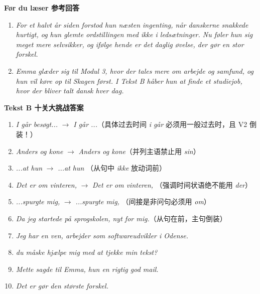 \begin{answerbox}
\textbf{Før du læser 参考回答}
\begin{enumerate}
  \item \textit{For et halvt år siden forstod hun næsten ingenting, når danskerne snakkede hurtigt, og hun glemte ordstillingen med \textit{ikke} i ledsætninger. Nu føler hun sig meget mere selvsikker, og ifølge hende er det daglig øvelse, der gør en stor forskel.}
  \item \textit{Emma glæder sig til Modul 3, hvor der tales mere om arbejde og samfund, og hun vil køre op til Skagen først. I Tekst B håber hun at finde et studiejob, hvor der bliver talt dansk hver dag.}
\end{enumerate}

\textbf{Tekst B 十关大挑战答案}
\begin{enumerate}
  \item[(1)] \textit{I går  besøgt...} $\rightarrow$ \textit{I går ...}（具体过去时间 \textit{i går} 必须用一般过去时，且 V2 倒装！）
  \item[(2)] \textit{Anders og  kone} $\rightarrow$ \textit{Anders og  kone}（并列主语禁止用 \textit{sin}）
  \item[(3)] \textit{...at hun } $\rightarrow$ \textit{...at hun }（从句中 \textit{ikke} 放动词前）
  \item[(4)] \textit{Det er om vinteren, } $\rightarrow$ \textit{Det er om vinteren, }（强调时间状语绝不能用 \textit{der}）
  \item[(5)] \textit{...spurgte mig, } $\rightarrow$ \textit{...spurgte mig, }（间接是非问句必须用 \textit{om}）
  \item[(6)] \textit{Da jeg startede på sprogskolen,  nyt for mig.}（从句在前，主句倒装）
  \item[(7)] \textit{Jeg har en ven,  arbejder som softwareudvikler i Odense.}
  \item[(8)] \textit{ du måske hjælpe mig med at tjekke min tekst?}
  \item[(9)] \textit{Mette sagde til Emma,  hun  en rigtig god mail.}
  \item[(10)] \textit{Det er  gør den største forskel.}
\end{enumerate}


\end{answerbox}
